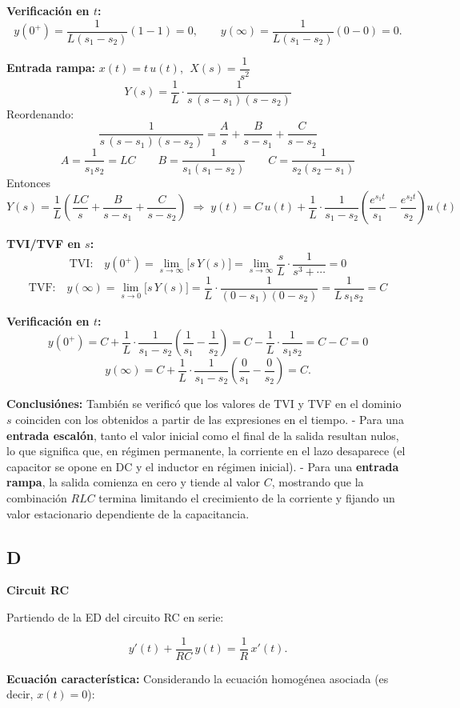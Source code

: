 \textbf{Verificación en \(t\):}
\[
y(0^+)=\frac{1}{L(s_1-s_2)}(1-1)=0,\qquad
y(\infty)=\frac{1}{L(s_1-s_2)}(0-0)=0.
\]

\medskip

\textbf{Entrada rampa:} \(x(t)=t\,u(t)\), \(\;X(s)=\dfrac{1}{s^2}\)
\[
Y(s)=\frac{1}{L}\cdot\frac{1}{s\,(s-s_1)(s-s_2)}
\]
Reordenando:
\[
\frac{1}{s\,(s-s_1)(s-s_2)}=\frac{A}{s}+\frac{B}{s-s_1}+\frac{C}{s-s_2}
\]
\[
A=\frac{1}{s_1 s_2}=LC\qquad
B=\frac{1}{s_1(s_1-s_2)}\qquad
C=\frac{1}{s_2(s_2-s_1)}
\]
Entonces
\[
Y(s)=\frac{1}{L}\left(\frac{LC}{s}+\frac{B}{s-s_1}+\frac{C}{s-s_2}\right)
\;\Rightarrow\;
y(t)=C\,u(t)+\frac{1}{L}\cdot\frac{1}{s_1-s_2}\!\left(\frac{e^{s_1 t}}{s_1}-\frac{e^{s_2 t}}{s_2}\right)\!u(t)
\]

\textbf{TVI/TVF en \(s\):}
\[
\text{TVI:}\quad y(0^+)=\lim_{s\to\infty}\big[s\,Y(s)\big]
=\lim_{s\to\infty}\frac{s}{L}\cdot\frac{1}{s^3+\cdots}=0
\]
\[
\text{TVF:}\quad y(\infty)=\lim_{s\to 0}\big[s\,Y(s)\big]
=\frac{1}{L}\cdot\frac{1}{(0-s_1)(0-s_2)}=\frac{1}{L\,s_1 s_2}=C
\]

\textbf{Verificación en \(t\):}
\[
y(0^+)=C+\frac{1}{L}\cdot\frac{1}{s_1-s_2}\!\left(\frac{1}{s_1}-\frac{1}{s_2}\right)
=C-\frac{1}{L}\cdot\frac{1}{s_1 s_2}=C-C=0
\]
\[
y(\infty)=C+\frac{1}{L}\cdot\frac{1}{s_1-s_2}\!\left(\frac{0}{s_1}-\frac{0}{s_2}\right)=C.
\]

\textbf{Conclusiónes:}  
También se verificó que los valores de TVI y TVF en el dominio $s$ coinciden con los obtenidos a partir de las expresiones en el tiempo.  
- Para una \textbf{entrada escalón}, tanto el valor inicial como el final de la salida resultan nulos, lo que significa que, en régimen permanente, la corriente en el lazo desaparece (el capacitor se opone en DC y el inductor en régimen inicial).  
- Para una \textbf{entrada rampa}, la salida comienza en cero y tiende al valor $C$, mostrando que la combinación $RLC$ termina limitando el crecimiento de la corriente y fijando un valor estacionario dependiente de la capacitancia.  

\subsection{D}

\textbf{Circuit RC}

Partiendo de la ED del circuito RC en serie:

\[
y'(t) + \frac{1}{RC}\,y(t) = \frac{1}{R}\,x'(t).
\]

\textbf{Ecuación característica:}  
Considerando la ecuación homogénea asociada (es decir, $x(t)=0$):

